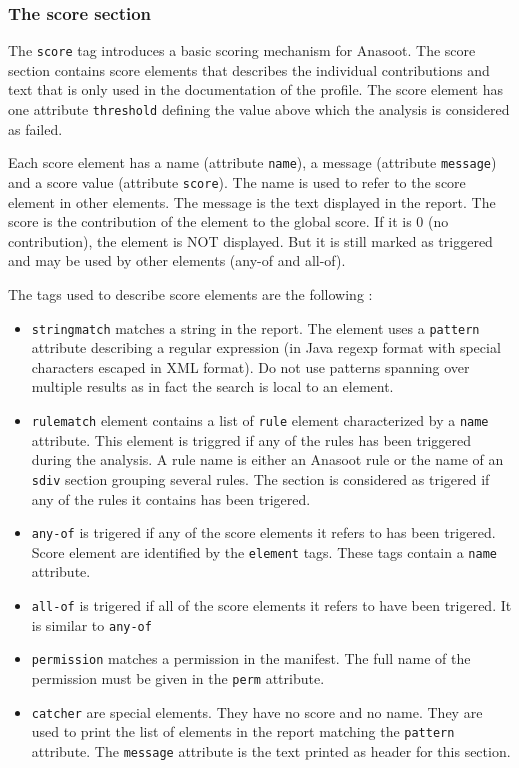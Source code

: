 \subsubsection{The score section}
The \verb!score! tag introduces a basic scoring mechanism for Anasoot. The score
section contains score elements that describes the individual contributions and
text that is only used in the documentation of the profile. The score element
has one attribute \verb!threshold! defining the value above which the analysis
is considered as failed.

Each score element has a name (attribute \verb!name!), a message (attribute
\verb!message!) and a score value (attribute \verb:score:). The name is used to
refer to the score element in other elements. The message is the text displayed
in the report. The score is the contribution of the element to the global score.
If it is 0 (no contribution), the element is NOT displayed. But it is still
marked as triggered and may be used by other elements (any-of and all-of).

The tags used to describe score elements are the following :
\begin{itemize}
  \item \verb!stringmatch! matches a string in the report. The element uses a
  \verb!pattern! attribute describing a regular expression (in Java regexp
  format with special characters escaped in XML format). Do not use patterns
  spanning over multiple results as in fact the search is local to an element.
  \item \verb!rulematch! element contains a list of \verb!rule! element
  characterized by a \verb!name! attribute. This element is triggred if any of
  the rules has been triggered during the analysis. A rule name is either an
  Anasoot rule or the name of an \verb!sdiv! section grouping several rules. The
  section is considered as trigered if any of the rules it contains has been
  trigered.
  \item \verb!any-of! is trigered if any of the score elements it refers to has
  been trigered. Score element are identified by the \verb!element! tags. These
  tags contain a \verb!name! attribute.
  \item \verb!all-of! is trigered if all of the score elements it refers to have
  been trigered. It is similar to \verb!any-of!
  \item \verb!permission! matches a permission in the manifest. The full name of
  the permission must be given in the \verb:perm: attribute.
  \item \verb!catcher! are special elements. They have no score and no name.
  They are used to print the list of elements in the report matching the
  \verb!pattern! attribute. The \verb!message! attribute is the text printed as
  header for this section.
\end{itemize}



